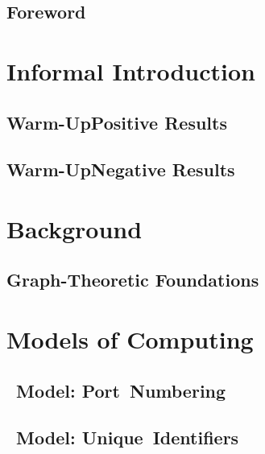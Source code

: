 





\frontmatter
\maketitle
\tableofcontents

\chapter*{Foreword}


\mainmatter
\part{Informal Introduction}

\chapter{Warm-Up\mydash Positive Results}\label{ch:intro-pos}


\chapter{Warm-Up\mydash Negative Results}\label{ch:intro-neg}


\part{Background}

\chapter{Graph-Theoretic Foundations}\label{ch:graphs}


\part{Models of Computing}

\chapter{\tPN{}~Model: Port~Numbering}\label{ch:pn}


\chapter{\tLOCAL{}~Model: Unique~Identifiers}\label{ch:local}


